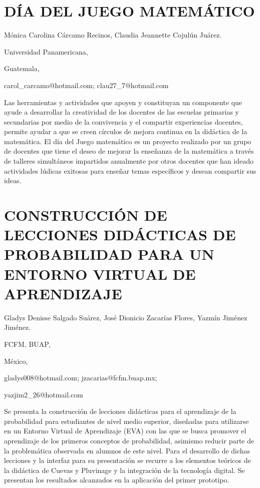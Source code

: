 \section{DÍA DEL JUEGO MATEMÁTICO }

\begin{datos}

Mónica Carolina Cárcamo Recinos, Claudia Jeannette Cojulún Juárez.

Universidad Panamericana,

Guatemala,

carol\_carcamo@hotmail.com; clau27\_7@hotmail.com

\end{datos}

Las herramientas y actividades que apoyen y constituyan un componente
que ayude a desarrollar la creatividad de los docentes de las escuelas
primarias y secundarias por medio de la convivencia y el compartir
experiencias docentes, permite ayudar a que se creen círculos de mejora
continua en la didáctica de la matemática. El día del Juego matemático
es un proyecto realizado por un grupo de docentes que tiene el deseo
de mejorar la enseñanza de la matemática a través de talleres simultáneos
impartidos anualmente por otros docentes que han ideado actividades
lúdicas exitosas para enseñar temas específicos y desean compartir
sus ideas.

\setcounter{section}{228}


\section{CONSTRUCCIÓN DE LECCIONES DIDÁCTICAS DE PROBABILIDAD PARA UN ENTORNO
VIRTUAL DE APRENDIZAJE }

\begin{datos}

Gladys Denisse Salgado Suárez, José Dionicio Zacarías Flores, Yazmín
Jiménez Jiménez.

FCFM, BUAP,

México,

gladys008@hotmail.com; jzacarias@fcfm.buap.mx;

yazjim2\_26@hotmail.com

\end{datos}

Se presenta la construcción de lecciones didácticas para el aprendizaje
de la probabilidad para estudiantes de nivel medio superior, diseñadas
para utilizarse en un Entorno Virtual de Aprendizaje (EVA) con las
que se busca promover el aprendizaje de los primeros conceptos de
probabilidad, asimismo reducir parte de la problemática observada
en alumnos de este nivel. Para el desarrollo de dichas lecciones y
la interfaz para su presentación se recurre a los elementos teóricos
de la didáctica de Cuevas y Pluvinage y la integración de la tecnología
digital. Se presentan los resultados alcanzados en la aplicación del
primer prototipo.

